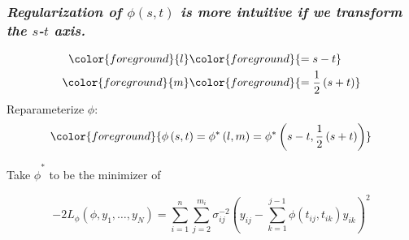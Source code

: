\documentclass[12pt]{beamer}
\newcommand{\newmaththought}[1]{{ \color{foreground} {#1}}}
\begin{document}
\begin{frame}
\frametitle{\emph{Regularization of $\phi\left(s,t\right)$ is more intuitive if we transform the $s$-$t$ axis. }}

\begin{align*}
\newmaththought{l} &\newmaththought{= s-t} \\
\newmaththought{m} &\newmaththought{= \frac{1}{2}\left(s+t\right)}
\end{align*}
\noindent
Reparameterize $\phi$:
\begin{align*}
\newmaththought{\phi\left(s,t\right) =\phi^*\left(l,m\right)= \phi^*\left(s-t, \frac{1}{2}\left(s+t\right)\right)}
\end{align*}

Take $\hat{\phi}^*$ to be the minimizer of 
\begin{adjustwidth}{-2cm}{-2cm}
\begin{equation}
-2 L_\phi\left(\phi, y_1, \dots,y_N \right) = \sum_{i=1}^n \sum_{j=2}^{m_i} \sigma_{ij}^{-2} \left(y_{ij} - \sum_{k=1}^{j-1}\phi\left({t_{ij},t_{ik}}\right)y_{ik} \right)^2 \label{loglikelihood}
\end{equation}
\end{adjustwidth}

\end{frame}






%
%
\end{document}
